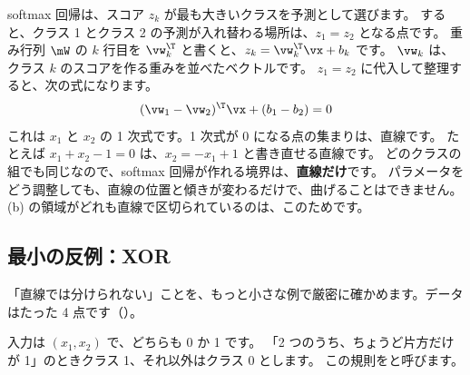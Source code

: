 softmax 回帰は、スコア $z_k$ が最も大きいクラスを予測として選びます。
すると、クラス 1 とクラス 2 の予測が入れ替わる場所は、$z_1=z_2$ となる点です。
重み行列 $\mW$ の $k$ 行目を $\vw_k^\T$ と書くと、$z_k=\vw_k^\T\vx+b_k$ です。
$\vw_k$ は、クラス $k$ のスコアを作る重みを並べたベクトルです。
$z_1=z_2$ に代入して整理すると、次の式になります。
\begin{equation}
(\vw_1-\vw_2)^\T\vx+(b_1-b_2)=0
\label{eq:nn-linear-boundary}
\end{equation}
これは $x_1$ と $x_2$ の 1 次式です。1 次式が 0 になる点の集まりは、直線です。
たとえば $x_1+x_2-1=0$ は、$x_2=-x_1+1$ と書き直せる直線です。
どのクラスの組でも同じなので、softmax 回帰が作れる境界は、\textbf{直線だけ}です。
パラメータをどう調整しても、直線の位置と傾きが変わるだけで、曲げることはできません。
(b) の領域がどれも直線で区切られているのは、このためです。

\subsection*{最小の反例：XOR}

「直線では分けられない」ことを、もっと小さな例で厳密に確かめます。データはたった 4 点です（）。

入力は $(x_1,x_2)$ で、どちらも 0 か 1 です。
「2 つのうち、ちょうど片方だけが 1」のときクラス 1、それ以外はクラス 0 とします。
この規則をと呼びます。

